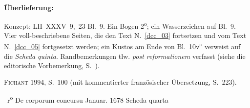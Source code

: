 %
%
%
%
%
\frenchspacing%
%
\begin{ledgroupsized}[r]{120mm}%
\footnotesize%
\pstart%
\noindent%
\textbf{Überlieferung:}%
\pend%
\end{ledgroupsized}%
\begin{ledgroupsized}[r]{114mm}%
\footnotesize%
\pstart %
\parindent -6mm%
%
Konzept:
LH~XXXV~9,~23 Bl.~9.
Ein Bogen 2\textsuperscript{o};
ein Wasserzeichen auf Bl.~9.
Vier voll-beschriebene Seiten,
die den Text N.~\ref{dcc_03} %
fortsetzen und vom Text N.~\ref{dcc_05} %
fortgesetzt werden;
ein Kustos am Ende von Bl.~10v\textsuperscript{o}\! verweist auf die \textit{Scheda quinta}.
Randbemerkungen tlw. \textit{post reformationem} verfasst (siehe die editorische Vorbemerkung, S.~).
\pend%
\end{ledgroupsized}%
%
\begin{ledgroupsized}[r]{114mm}%
\footnotesize%
\pstart%
\parindent -6mm%
%
\textsc{Fichant}\cite{01056} 1994, S.~100
(mit kommentierter französischer Übersetzung, S.~223).
\pend%
\end{ledgroupsized}%
%
%
\frenchspacing%
%
%
\count{}%
\count{}%
\count{}%
\vspace{8mm}
\normalsize%
\pstart%
\noindent%
%
~r\textsuperscript{o}\rbrack%
\hspace{43mm}%
De%
corporum concursu%
\protect{}%
\hspace{30mm}
Januar. 1678
\pend%
\pstart%
\noindent%
\centering%
Scheda quarta%
\protect{}%
%
%
